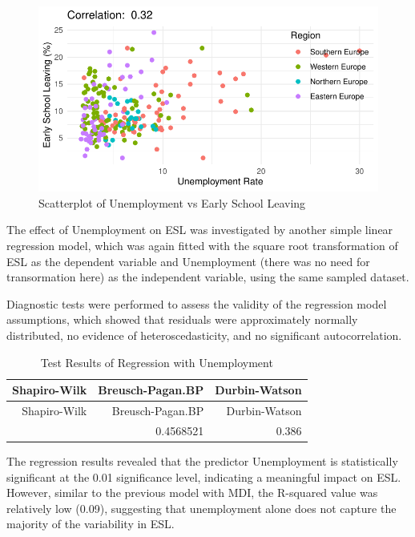 \documentclass[
  letterpaper,
  DIV=11,
  numbers=noendperiod,
  abstract]{scrartcl}
\begin{document}
\begin{figure}[H]

{\centering \includegraphics[width=1\textwidth,height=\textheight]{report_files/figure-pdf/scatter unemployment-1.pdf}

}

\caption{Scatterplot of Unemployment vs Early School Leaving}

\end{figure}%

The effect of Unemployment on ESL was investigated by another simple
linear regression model, which was again fitted with the square root
transformation of ESL as the dependent variable and Unemployment (there
was no need for transormation here) as the independent variable, using
the same sampled dataset.

Diagnostic tests were performed to assess the validity of the regression
model assumptions, which showed that residuals were approximately
normally distributed, no evidence of heteroscedasticity, and no
significant autocorrelation.

\begin{longtable}[]{@{}rrr@{}}
\caption{Test Results of Regression with Unemployment}\tabularnewline
\toprule\noalign{}
Shapiro-Wilk & Breusch-Pagan.BP & Durbin-Watson \\
\midrule\noalign{}
\endfirsthead
\toprule\noalign{}
Shapiro-Wilk & Breusch-Pagan.BP & Durbin-Watson \\
\midrule\noalign{}
\endhead
\bottomrule\noalign{}
\endlastfoot
0.0557342 & 0.4568521 & 0.386 \\
\end{longtable}

The regression results revealed that the predictor Unemployment is
statistically significant at the 0.01 significance level, indicating a
meaningful impact on ESL. However, similar to the previous model with
MDI, the R-squared value was relatively low (0.09), suggesting that
unemployment alone does not capture the majority of the variability in
ESL.
\end{document}
